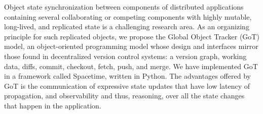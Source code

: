 \documentclass[a4paper,UKenglish]{dagrep-v2018}
\begin{document}

\license

Object state synchronization between components of distributed applications containing several collaborating or competing components with highly mutable, long-lived, and replicated state is a challenging research area. As an organizing principle for such replicated objects, we propose the Global Object Tracker (GoT) model, an object-oriented programming model whose design and interfaces mirror those found in decentralized version control systems: a version graph, working data, diffs, commit, checkout, fetch, push, and merge. We have implemented GoT in a framework called Spacetime, written in Python. The advantages offered by GoT is the communication of expressive state updates that have low latency of propagation, and observability and thus, reasoning, over all the state changes that happen in the application.







\newpage
\end{document}
